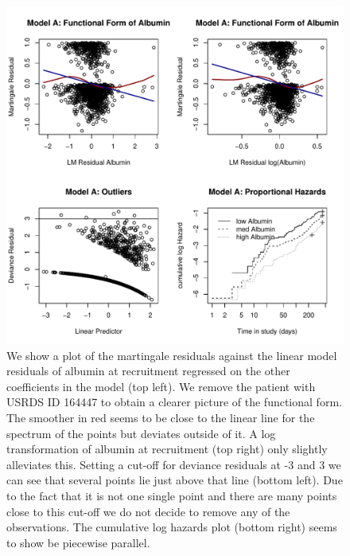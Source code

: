\documentclass[paper=a4, fontsize=11pt]{scrartcl} %
\numberwithin{equation}{section} %
\numberwithin{figure}{section} %
\numberwithin{table}{section} %
\begin{document}
\begin{figure}[H]
\centering
\includegraphics[width=.8\textwidth]{plots/modela_diag.pdf}
\caption{We show a plot of the martingale residuals against the linear model residuals of albumin at recruitment regressed on the other coefficients in the model (top left). We remove the patient with USRDS ID 164447 to obtain a clearer picture of the functional form. The smoother in red seems to be close to the linear line for the spectrum of the points but deviates outside of it. A log transformation of albumin at recruitment (top right) only slightly alleviates this. Setting a cut-off for deviance residuals at -3 and 3 we can see that several points lie just above that line (bottom left). Due to the fact that it is not one single point and there are many points close to this cut-off we do not decide to remove any of the observations. The cumulative log hazards plot (bottom right) seems to show be piecewise parallel.}
\label{fig:modela_diag}
\end{figure}
\end{document}
